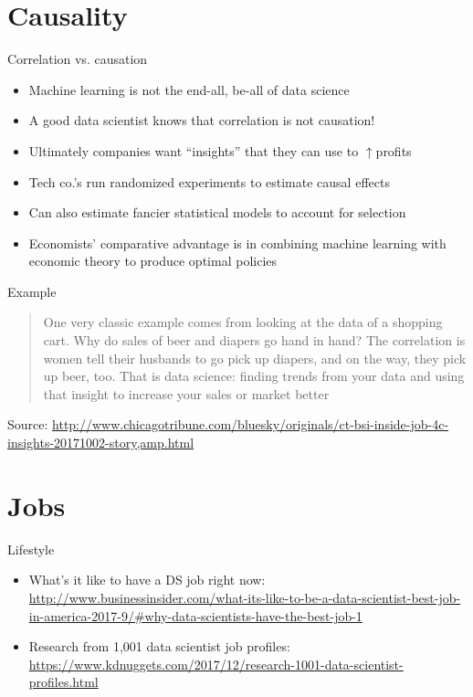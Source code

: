 \documentclass[english,aspectratio=169,12pt,xcolor=dvipsnames]{beamer}
\begin{document}
\section{Causality}
\begin{frame}{Correlation vs. causation}
\begin{itemize}
\item Machine learning is not the end-all, be-all of data science
\item A good data scientist knows that correlation is not causation!
\item Ultimately companies want ``insights'' that they can use to $\uparrow$profits
\item Tech co.'s run randomized experiments to estimate causal effects
\item Can also estimate fancier statistical models to account for selection
\item Economists' comparative advantage is in combining machine learning with economic theory to produce optimal policies
\end{itemize}
\end{frame}

\begin{frame}{Example}
\begin{quote}
One very classic example comes from looking at the data of a shopping cart. Why do sales of beer and diapers go hand in hand? The correlation is women tell their husbands to go pick up diapers, and on the way, they pick up beer, too. That is data science: finding trends from your data and using that insight to increase your sales or market better
\end{quote}
Source: \url{http://www.chicagotribune.com/bluesky/originals/ct-bsi-inside-job-4c-insights-20171002-story,amp.html}
\end{frame}

\section{Jobs}
\begin{frame}{Lifestyle}
\begin{itemize}
\item What's it like to have a DS job right now: \url{http://www.businessinsider.com/what-its-like-to-be-a-data-scientist-best-job-in-america-2017-9/\#why-data-scientists-have-the-best-job-1}
\item Research from 1,001 data scientist job profiles: \url{https://www.kdnuggets.com/2017/12/research-1001-data-scientist-profiles.html}
\end{itemize}
\end{frame}
\end{document}
